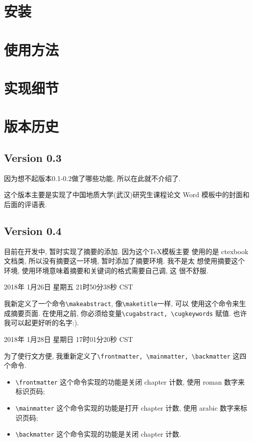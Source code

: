 \documentclass{cugrep}
\begin{document}
\chapter{安装}

\chapter{使用方法}

\chapter{实现细节}

\chapter{版本历史}

\section{Version 0.3}
\label{sec:version_0_3}
因为想不起版本0.1-0.2做了哪些功能, 所以在此就不介绍了.

这个版本主要是实现了中国地质大学(武汉)研究生课程论文 Word 模板中的封面和后面的评语表.
\section{Version 0.4}
\label{sec:version_0_4}

目前在开发中, 暂时实现了摘要的添加. 因为这个\TeX{}模板主要 使用的是
ctexbook 文档类, 所以没有摘要这一环境, 暂时添加了摘要环境. 我不是太
想使用摘要这个环境, 使用环境意味着摘要和关键词的格式需要自己调, 这
很不舒服.

2018年 1月26日 星期五 21时50分38秒 CST

我新定义了一个命令\verb|\makeabstract|, 像\verb|\maketitle|一样, 可以
使用这个命令来生成摘要页面. 在使用之前, 你必须给变量\verb|\cugabstract, \cugkeywords| 赋值. 也许我可以起更好听的名字:).

2018年 1月28日 星期日 17时01分20秒 CST

为了使行文方便, 我重新定义了\verb|\frontmatter, \mainmatter, \backmatter| 这四个命令. 

\begin{itemize}
    \item \verb|\frontmatter| 这个命令实现的功能是关闭 chapter 计数, 使用 roman 数字来标识页码;
    \item \verb|\mainmatter| 这个命令实现的功能是打开 chapter 计数, 使用 arabic 数字来标识页码;
    \item \verb|\backmatter| 这个命令实现的功能是关闭 chapter 计数.
\end{itemize}
\end{document}
